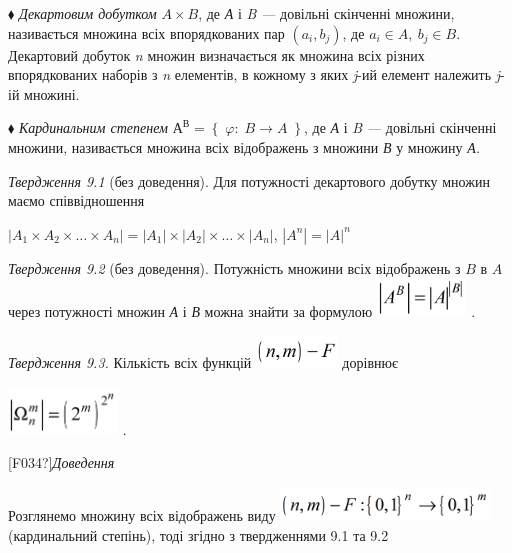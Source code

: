 ${\blacklozenge}$ \textit{Декартовим добутком}  ${A\times B}$, де
\textit{А}\textit{ }і \textit{B}\textit{ }\textit{--- }довільні скінченні
множини, називається множина всіх впорядкованих пар 
${\left(a_{{i}},b_{{j}}\right)}$, де  ${a_{{i}}\in A,\ b_{{j}}\in B}$. 
Декартовий добуток  \textit{n} множин визначається як множина всіх різних
впорядкованих наборів з \textit{n}\textit{ }елементів, в кожному з яких 
\textit{j}{}-ий елемент належить \textit{j}{}-ій  множині.

${\blacklozenge}$ \textit{Кардинальним степенем }
${\text{А}^{{\text{В}}}=\left\{\;\varphi :\;B\rightarrow A\;\right\}}$, де
\textit{А }і \textit{B }\textit{--- }довільні скінченні множини, називається
множина всіх відображень з множини \textit{В} у множину  \textit{А. } 

\textit{Твердження 9.1} (без доведення). Для потужності декартового добутку
множин маємо співвідношення 

 ${|A_{{1}}\times A_{{2}}\times \dots\times
A_{{n}}|=|A_{{1}}|\times |A_{{2}}|\times \dots\times
|A_{{n}}|}$,   ${|A^{{n}}|=|A|^{{n}}}$


\bigskip

\textit{Твердження 9.2} (без доведення).\textit{ }Потужність множини всіх
відображень з   ${B}$\textit{ }в\textit{ } ${A}$  через потужності  множин 
\textit{А  }і  \textit{В}  можна знайти за формулою  
\includegraphics[width=0.9354in,height=0.4055in]{crypt-img/crypt-img94.png} . 

\textit{Твердження 9.3. }Кількість всіх функцій 
\includegraphics[width=0.8508in,height=0.3346in]{crypt-img/crypt-img95.png} 
дорівнює 

{\centering
 \includegraphics[width=1.1457in,height=0.5in]{crypt-img/crypt-img96.png} .
\par}

\textlatin{[F034?]}\textit{Доведення} 

Розглянемо множину всіх відображень виду 
\includegraphics[width=2.1925in,height=0.3583in]{crypt-img/crypt-img97.png} 
(кардинальний степінь), тоді згідно з твердженнями 9.1 та 9.2

